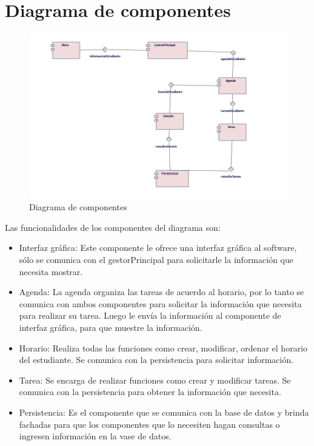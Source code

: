 \section{Diagrama de componentes}
\begin{figure}[H]
	\centering
	\includegraphics[width=1\linewidth]{diseno/componentes/img/diagramaComponentes}
	\caption{Diagrama de componentes}
	\label{fig:componentes}
\end{figure}
Las funcionalidades de los componentes del diagrama son:
\begin{itemize}
	\item Interfaz gráfica: Este componente le ofrece una interfaz gráfica al software, sólo se comunica con el gestorPrincipal para solicitarle la información que necesita mostrar.
	\item Agenda: La agenda organiza las tareas de acuerdo al horario, por lo tanto se comunica con ambos componentes para solicitar la información que necesita para realizar su tarea. Luego le envía la información al componente de interfaz gráfica, para que muestre la información.
	\item Horario: Realiza todas las funciones como crear, modificar, ordenar el horario del estudiante. Se comunica con la persistencia para solicitar información.
	\item Tarea: Se encarga de realizar funciones como crear y  modificar tareas. Se comunica con la persistencia para obtener la información que necesita.
	\item Persistencia: Es el componente que se comunica con la base de datos y brinda fachadas para que los componentes que lo necesiten hagan consultas o ingresen información en la vase de datos.
\end{itemize}
	
